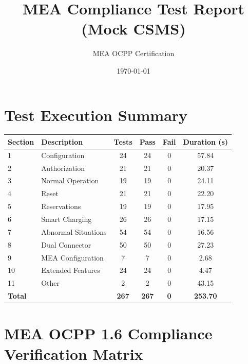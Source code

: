 \documentclass[10pt, a4paper, landscape]{article}
\title{\textbf{MEA Compliance Test Report (Mock CSMS)}}
\author{MEA OCPP Certification}
\date{\today}
\begin{document}
\maketitle

\section*{Test Execution Summary}
\renewcommand{\arraystretch}{1.5}
\begin{table}[h]
\centering
\begin{tabular}{|l|l|c|c|c|c|}
\hline
\rowcolor{blue!10}
\textbf{Section} & \textbf{Description} & \textbf{Tests} & \textbf{Pass} & \textbf{Fail} & \textbf{Duration (s)} \\ \hline
1 & Configuration & 24 & 24 & 0 & 57.84 \\ \hline
2 & Authorization & 21 & 21 & 0 & 20.37 \\ \hline
3 & Normal Operation & 19 & 19 & 0 & 24.11 \\ \hline
4 & Reset & 21 & 21 & 0 & 22.20 \\ \hline
5 & Reservations & 19 & 19 & 0 & 17.95 \\ \hline
6 & Smart Charging & 26 & 26 & 0 & 17.15 \\ \hline
7 & Abnormal Situations & 54 & 54 & 0 & 16.56 \\ \hline
8 & Dual Connector & 50 & 50 & 0 & 27.23 \\ \hline
9 & MEA Configuration & 7 & 7 & 0 & 2.68 \\ \hline
10 & Extended Features & 24 & 24 & 0 & 4.47 \\ \hline
11 & Other & 2 & 2 & 0 & 43.15 \\ \hline
\rowcolor{gray!20}
\textbf{Total} & & \textbf{267} & \textbf{267} & \textbf{0} & \textbf{253.70} \\ \hline
\end{tabular}
\end{table}

\newpage

\section*{MEA OCPP 1.6 Compliance Verification Matrix}
\end{document}
